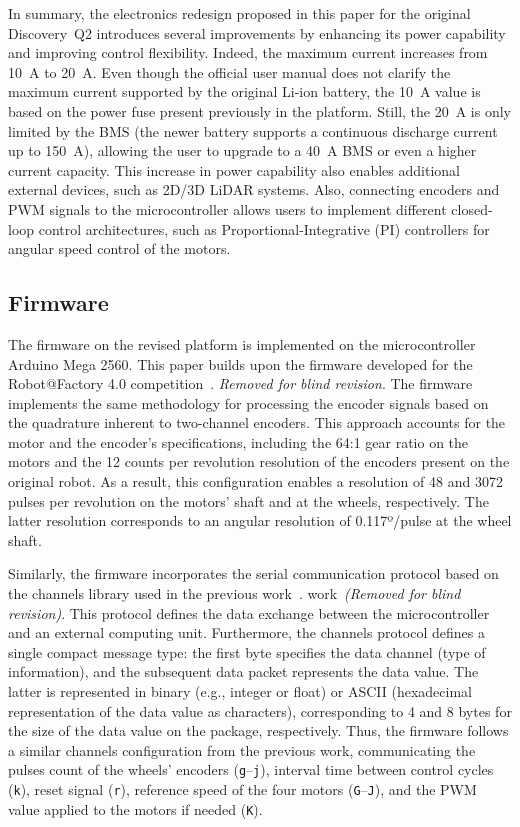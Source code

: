 \documentclass[letterpaper,10pt,conference]{IEEEtran} %
\def\finalversion{}
\begin{document}
In summary, the electronics redesign proposed in this paper
for the original Discovery~Q2 introduces several improvements
by enhancing its power capability and improving control flexibility.
Indeed, the maximum current increases from 10~A to 20~A.
Even though the official user manual does not clarify the maximum current
supported by the original Li-ion battery,
the 10~A value is based on the power fuse present previously in the platform.
Still, the 20~A is only limited by the BMS
(the newer battery supports a continuous discharge current up to 150~A),
allowing the user to upgrade to a 40~A BMS or even a higher current capacity.
This increase in power capability also enables additional external devices,
such as 2D/3D LiDAR systems.
Also, connecting encoders and PWM signals to the microcontroller
allows users to implement different closed-loop control architectures,
such as Proportional-Integrative (PI) controllers for 
angular speed control of the motors.

\subsection{Firmware}

The firmware on the revised platform is implemented on the
microcontroller Arduino Mega 2560.
This paper builds upon the firmware developed for the
\ifdefined\finalversion
Robot@Factory 4.0 competition~\cite{sousa2024icarsc}.
\else
\textit{Removed for blind revision}.
\fi
The firmware implements the same methodology for
processing the encoder signals
based on the quadrature inherent to two-channel encoders.
This approach accounts for the motor and the encoder's specifications,
including the 64:1 gear ratio on the motors
and the 12 counts per revolution resolution of the encoders
present on the original robot.
As a result, this configuration enables a resolution of
48 and 3072 pulses per revolution on the 
motors' shaft and at the wheels, respectively.
The latter resolution corresponds to an 
angular resolution of 0.117º/pulse at the wheel shaft.

Similarly, the firmware incorporates the serial communication protocol
based on the channels library used in the previous
\ifdefined\finalversion
work~\cite{sousa2024icarsc}.
\else
work~\textit{(Removed for blind revision)}.
\fi
This protocol defines the data exchange between
the microcontroller and an external computing unit.
Furthermore, the channels protocol defines a single compact message type:
the first byte specifies the data channel (type of information),
and the subsequent data packet represents the data value.
The latter is represented in binary (e.g., integer or float) or
ASCII (hexadecimal representation of the data value as characters),
corresponding to 4 and 8 bytes for the 
size of the data value on the package, respectively.
Thus, the firmware follows a similar channels configuration
from the previous work, communicating
the pulses count of the wheels' encoders (\texttt{g}--\texttt{j}),
interval time between control cycles (\texttt{k}),
reset signal (\texttt{r}),
reference speed of the four motors (\texttt{G}--\texttt{J}),
and the PWM value applied to the motors if needed (\texttt{K}).
\end{document}
